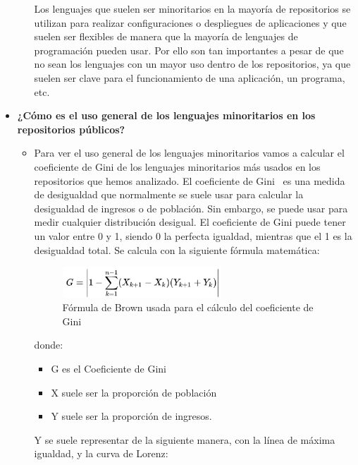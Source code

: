 \documentclass[a4paper, 12pt]{book}
\begin{document}
\begin{itemize}
\begin{itemize}
          Los lenguajes que suelen ser minoritarios en la mayoría de repositorios se utilizan para realizar configuraciones o despliegues de aplicaciones y que suelen ser flexibles de manera que la mayoría de lenguajes de programación pueden usar. Por ello son tan importantes a pesar de que no sean los lenguajes con un mayor uso dentro de los repositorios, ya que suelen ser clave para el funcionamiento de una aplicación, un programa, etc.
        \end{itemize}
  \item \textbf{¿Cómo es el uso general de los lenguajes minoritarios en los repositorios públicos?}
        \begin{itemize}
          \item Para ver el uso general de los lenguajes minoritarios vamos a calcular el coeficiente de Gini de los lenguajes minoritarios más usados en los repositorios que hemos analizado.
          El coeficiente de Gini~\cite{gini:_gini} es una medida de desigualdad que normalmente se suele usar para calcular la desigualdad de ingresos o de población. Sin embargo, se puede usar para medir cualquier distribución desigual. El coeficiente de Gini puede tener un valor entre 0 y 1, siendo 0 la perfecta igualdad, mientras que el 1 es la desigualdad total. Se calcula con la siguiente fórmula matemática:

          \begin{figure}[H]
            \centering
            \includegraphics[width=0.6\textwidth]{img/giniformula.png}
            \caption{Fórmula de Brown usada para el cálculo del coeficiente de Gini}
            \label{figura:giniformula}
          \end{figure}
          
          donde:
            \begin{itemize}
              \item G es el Coeficiente de Gini
              \item X suele ser la proporción de población
              \item Y suele ser la proporción de ingresos.
            \end{itemize}
          Y se suele representar de la siguiente manera, con la línea de máxima igualdad, y la curva de Lorenz:
            

\end{itemize}
\end{itemize}
\end{document}
